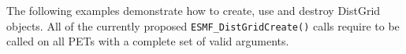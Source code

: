 
The following examples demonstrate how to create, use and destroy DistGrid objects. All of the currently proposed {\tt ESMF\_DistGridCreate()} calls require to be called on all PETs with a complete set of valid arguments.
